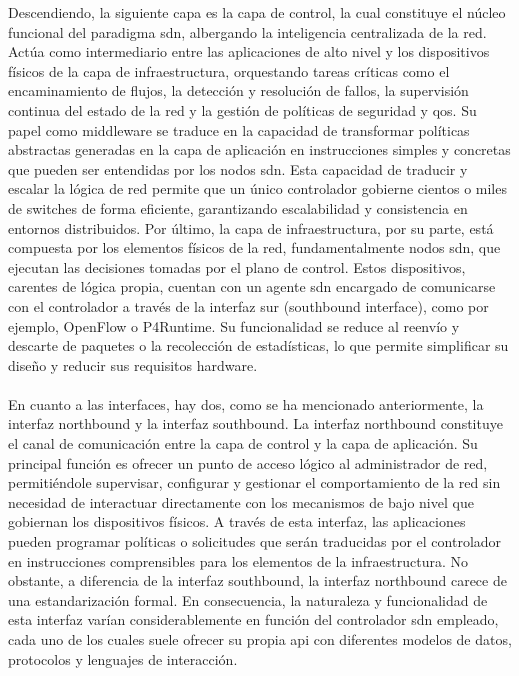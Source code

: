 Descendiendo, la siguiente capa es la capa de control, la cual constituye el núcleo funcional del paradigma \gls{sdn}, albergando la inteligencia centralizada de la red. Actúa como intermediario entre las aplicaciones de alto nivel y los dispositivos físicos de la capa de infraestructura, orquestando tareas críticas como el encaminamiento de flujos, la detección y resolución de fallos, la supervisión continua del estado de la red y la gestión de políticas de seguridad y \gls{qos}. Su papel como middleware se traduce en la capacidad de transformar políticas abstractas generadas en la capa de aplicación en instrucciones simples y concretas que pueden ser entendidas por los nodos \gls{sdn}. Esta capacidad de traducir y escalar la lógica de red permite que un único controlador gobierne cientos o miles de switches de forma eficiente, garantizando escalabilidad y consistencia en entornos distribuidos. Por último, la capa de infraestructura, por su parte, está compuesta por los elementos físicos de la red, fundamentalmente nodos \gls{sdn}, que ejecutan las decisiones tomadas por el plano de control. Estos dispositivos, carentes de lógica propia, cuentan con un agente \gls{sdn} encargado de comunicarse con el controlador a través de la interfaz sur (southbound interface), como por ejemplo, OpenFlow o P4Runtime. Su funcionalidad se reduce al reenvío y descarte de paquetes o la recolección de estadísticas, lo que permite simplificar su diseño y reducir sus requisitos hardware.\\
\\
En cuanto a las interfaces, hay dos, como se ha mencionado anteriormente, la interfaz northbound y la interfaz southbound. La interfaz northbound constituye el canal de comunicación entre la capa de control y la capa de aplicación. Su principal función es ofrecer un punto de acceso lógico al administrador de red, permitiéndole supervisar, configurar y gestionar el comportamiento de la red sin necesidad de interactuar directamente con los mecanismos de bajo nivel que gobiernan los dispositivos físicos. A través de esta interfaz, las aplicaciones pueden programar políticas o solicitudes que serán traducidas por el controlador en instrucciones comprensibles para los elementos de la infraestructura. No obstante, a diferencia de la interfaz southbound, la interfaz northbound carece de una estandarización formal. En consecuencia, la naturaleza y funcionalidad de esta interfaz varían considerablemente en función del controlador \gls{sdn} empleado, cada uno de los cuales suele ofrecer su propia \gls{api} con diferentes modelos de datos, protocolos y lenguajes de interacción.\\
